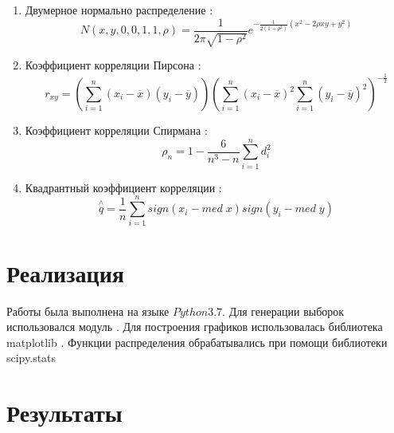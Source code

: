 \documentclass[12pt]{report}
\begin{document}
\begin{enumerate}
    \item Двумерное нормально распределение \cite{5_1}:
        \begin{equation}
        N(x,y,0,0,1,1,\rho) = \frac{1}{2\pi\sqrt{1-\rho^2}}e^{-\frac{1}{2(1-\rho^2)}(x^2-2\rho x y+y^2)} \label{dnd}
        \end{equation}
    
    \item Коэффициент корреляции Пирсона \cite{5_2}:
        \begin{equation}
        r_{xy} = \left(\sum\limits_{i=1}^n(x_i-\overline{x})(y_i-\overline{y})\right)\left(\sum\limits_{i=1}^n(x_i-\overline{x})^2\sum\limits_{i=1}^n(y_i-\overline{y})^2\right)^{-\frac{1}{2}} \label{ccp}
        \end{equation}
    \item Коэффициент корреляции Спирмана \cite{5_3}:
        \begin{equation}
        \rho_n = 1 -  \frac{6}{n^3-n}\sum\limits_{i=1}^n d_i^2\label{ccs}
        \end{equation}
        
    \item Квадрантный коэффициент корреляции \cite{5_4}:
        \begin{equation}
        \overset{\wedge}{q} = \frac{1}{n}\sum\limits_{i=1}^n sign(x_i-med\;x)sign(y_i-med\;y)\label{qcc}
        \end{equation}
\end{enumerate}

\section{Реализация}
Работы была выполнена на языке $Python 3.7.$
Для генерации выборок использовался модуль \cite{numpy}.
Для построения графиков использовалась библиотека matplotlib \cite{plotlib}.
Функции распределения обрабатывались при помощи библиотеки scipy.stats \cite{skp}

\section{Результаты}
\end{document}
